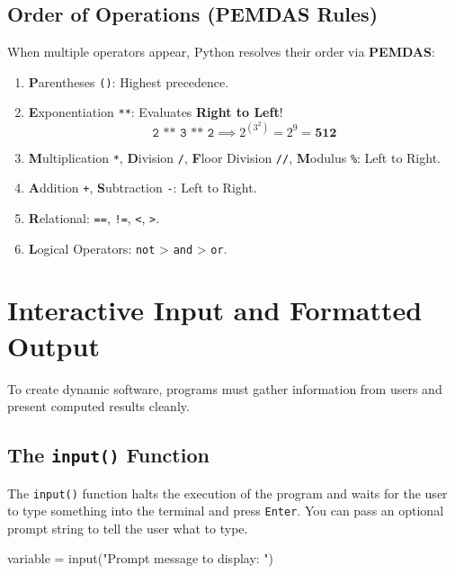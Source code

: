 \subsection{Order of Operations (PEMDAS Rules)}

When multiple operators appear, Python resolves their order via \textbf{PEMDAS}:
\begin{enumerate}[leftmargin=1.5em]
    \item \textbf{P}arentheses \texttt{()}: Highest precedence.
    \item \textbf{E}xponentiation \texttt{**}: Evaluates \textbf{Right to Left}!
    \begin{equation*}
        \texttt{2 ** 3 ** 2} \implies 2^{(3^2)} = 2^9 = \mathbf{512}
    \end{equation*}
    \item \textbf{M}ultiplication \texttt{*}, \textbf{D}ivision \texttt{/}, \textbf{F}loor Division \texttt{//}, \textbf{M}odulus \texttt{\%}: Left to Right.
    \item \textbf{A}ddition \texttt{+}, \textbf{S}ubtraction \texttt{-}: Left to Right.
    \item \textbf{R}elational: \texttt{==}, \texttt{!=}, \texttt{<}, \texttt{>}.
    \item \textbf{L}ogical Operators: \texttt{not} > \texttt{and} > \texttt{or}.
\end{enumerate}


\section{Interactive Input and Formatted Output}

To create dynamic software, programs must gather information from users and present computed results cleanly.

\subsection{The \texttt{input()} Function}

The \texttt{input()} function halts the execution of the program and waits for the user to type something into the terminal and press \texttt{Enter}. You can pass an optional prompt string to tell the user what to type.

\begin{syntaxbox}
variable = input("Prompt message to display: ")
\end{syntaxbox}

